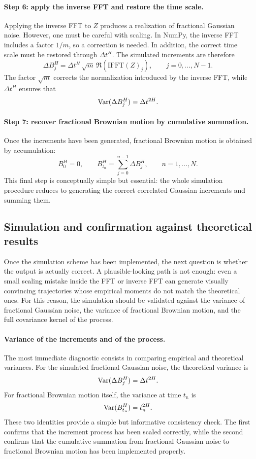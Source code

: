 \paragraph{Step 6: apply the inverse FFT and restore the time scale.} Applying the inverse FFT to \(Z\) produces a realization of fractional Gaussian noise. However, one must be careful with scaling. In NumPy, the inverse FFT includes a factor \(1/m\), so a correction is needed. In addition, the correct time scale must be restored through \(\Delta t^H\). The simulated increments are therefore
\[
\Delta B_j^H
=
\Delta t^H\,\sqrt{m}\,
\Re\!\left(\mathrm{IFFT}(Z)_j\right),
\qquad j=0,\dots,N-1.
\]
The factor \(\sqrt{m}\) corrects the normalization introduced by the inverse FFT, while \(\Delta t^H\) ensures that
\[
\operatorname{Var}(\Delta B_j^H)=\Delta t^{2H}.
\]

\paragraph{Step 7: recover fractional Brownian motion by cumulative summation.} Once the increments have been generated, fractional Brownian motion is obtained by accumulation:
\[
B_0^H=0,
\qquad
B_{t_n}^H=\sum_{j=0}^{n-1}\Delta B_j^H,
\qquad n=1,\dots,N.
\]
This final step is conceptually simple but essential: the whole simulation procedure reduces to generating the correct correlated Gaussian increments and summing them.

\subsection{Simulation and confirmation against theoretical results}

Once the simulation scheme has been implemented, the next question is whether the output is actually correct. A plausible-looking path is not enough: even a small scaling mistake inside the FFT or inverse FFT can generate visually convincing trajectories whose empirical moments do not match the theoretical ones. For this reason, the simulation should be validated against the variance of fractional Gaussian noise, the variance of fractional Brownian motion, and the full covariance kernel of the process.

\paragraph{Variance of the increments and of the process.} The most immediate diagnostic consists in comparing empirical and theoretical variances. For the simulated fractional Gaussian noise, the theoretical variance is
\[
\operatorname{Var}(\Delta B_j^H)=\Delta t^{2H}.
\]
For fractional Brownian motion itself, the variance at time \(t_n\) is
\[
\operatorname{Var}(B_{t_n}^H)=t_n^{2H}.
\]
These two identities provide a simple but informative consistency check. The first confirms that the increment process has been scaled correctly, while the second confirms that the cumulative summation from fractional Gaussian noise to fractional Brownian motion has been implemented properly.

